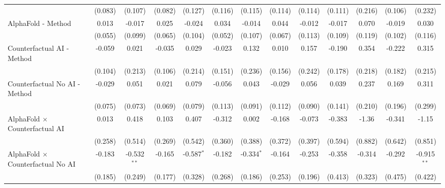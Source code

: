 \begin{tabular}{lcccccccccccc}
                                                              & (0.083) & (0.107)       & (0.082) & (0.127)       & (0.116) & (0.115)       & (0.114) & (0.114)      & (0.111) & (0.216) & (0.106)       & (0.232)\\   
   AlphaFold - Method                                         & 0.013   & -0.017        & 0.025   & -0.024        & 0.034   & -0.014        & 0.044   & -0.012       & -0.017  & 0.070   & -0.019        & 0.030\\   
                                                              & (0.055) & (0.099)       & (0.065) & (0.104)       & (0.052) & (0.107)       & (0.067) & (0.113)      & (0.109) & (0.119) & (0.102)       & (0.116)\\   
   Counterfactual AI - Method                                 & -0.059  & 0.021         & -0.035  & 0.029         & -0.023  & 0.132         & 0.010   & 0.157        & -0.190  & 0.354   & -0.222        & 0.315\\   
                                                              & (0.104) & (0.213)       & (0.106) & (0.214)       & (0.151) & (0.236)       & (0.156) & (0.242)      & (0.178) & (0.218) & (0.182)       & (0.215)\\   
   Counterfactual No AI - Method                              & -0.029  & 0.051         & 0.021   & 0.079         & -0.056  & 0.043         & -0.029  & 0.056        & 0.039   & 0.237   & 0.169         & 0.311\\   
                                                              & (0.075) & (0.073)       & (0.069) & (0.079)       & (0.113) & (0.091)       & (0.112) & (0.090)      & (0.141) & (0.210) & (0.196)       & (0.299)\\   
   AlphaFold $\times$ Counterfactual AI                       & 0.013   & 0.418         & 0.103   & 0.407         & -0.312  & 0.002         & -0.168  & -0.073       & -0.383  & -1.36   & -0.341        & -1.15\\   
                                                              & (0.258) & (0.514)       & (0.269) & (0.542)       & (0.360) & (0.388)       & (0.372) & (0.397)      & (0.594) & (0.882) & (0.642)       & (0.851)\\   
   AlphaFold $\times$ Counterfactual No AI                    & -0.183  & -0.532$^{**}$ & -0.165  & -0.587$^{*}$  & -0.182  & -0.334$^{*}$  & -0.164  & -0.253       & -0.358  & -0.314  & -0.292        & -0.915$^{**}$\\   
                                                              & (0.185) & (0.249)       & (0.177) & (0.328)       & (0.268) & (0.186)       & (0.253) & (0.196)      & (0.413) & (0.323) & (0.475)       & (0.422)\\   

\end{tabular}
